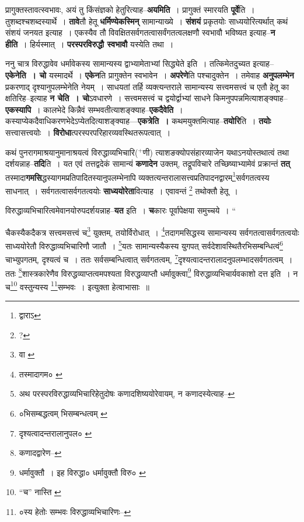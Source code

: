 \documentclass[article,12pt,a4paper]{memoir}
\newcommand{\add}[1]{($^{+}$#1)}
\begin{document}
	  \pstart प्रागुक्तस्तावत्स्वभावः, अयं तु किंसंज्ञको हेतुरित्याह--\textbf{अयमिति} । प्रागुक्तं स्मारयति \textbf{पूर्वे}ति । तुशब्दश्चशब्दस्यार्थे । \textbf{तावे}तौ हेतू \textbf{धर्मिण्येकस्मिन्} सामान्याख्ये । \textbf{संशयं} प्रकृतयोः साध्ययोरित्यर्थात् कथं संशयं जनयत इत्याह । एकस्यैव तौ विवक्षितसर्वगतत्वासर्वंगतत्वलक्षणौ स्वभावौ भविष्यत इत्याह--\textbf{न हीति} । हिर्यस्मात् । \textbf{परस्परविरुद्धौ स्वभावौ} यस्येति तथा ।
	\pend
      

	  \pstart ननु चात्र विरुद्धावेव धर्मावेकस्य सामान्यस्य द्वाभ्यामेताभ्यां सिद्ध्येते इति । तत्किमेतदुच्यत इत्याह--\textbf{एकेनेति । चो} यस्मादर्थे । \textbf{एकेन}ति प्रागुक्तेन स्वभावेन । \textbf{अपरेणे}ति पश्चादुक्तेन । तमेवाह \textbf{अनुपलम्भेन} प्रकरणाद् दृश्यानुपलम्भेनेति नेयम् । साधयतां तर्हि व्यक्त्यन्तराले सामान्यस्य सत्त्वमसत्त्वं च एतौ हेतू का क्षतिरिह--इत्याह \textbf{न चेति । चो}ऽवधारणे । सत्त्वमसत्त्वं च द्वयोर्द्वाभ्यां साधने किमनुपपन्नमित्याशङ्क्याह--\textbf{एकस्यापि} । कालभेदे किन्नैवं सम्भवतीत्याशङ्क्याह--\textbf{एकदैवेति} । कस्याप्येकदैवाधिकरणभेदेऽप्येतदित्याशङ्क्याह—\textbf{एकत्रेति ।} कथमयुक्तमित्याह--\textbf{तयोरि}ति । \textbf{तयोः} सत्त्वासत्त्वयोः । \textbf{विरोधा}त्परस्परपरिहारव्यवस्थितरूपत्वात् ।
	\pend
      

	  \pstart कथं पुनरागमाश्रयानुमानाश्रयत्वं विरुद्धाव्यभिचारि\add{णी} त्याशङक्योपसंहारव्याजेन यथाऽनयोस्तथात्वं तथा दर्शयन्नाह--\textbf{तदि}ति । यत एवं तत्तद्वदेकं सामान्यं \textbf{कणादेन} उक्तम्, तद्रूपविचारे तच्छिष्याभ्यामेवं प्रक्रान्तं \textbf{तत्} तस्मादा\textbf{गमसि}द्धस्यागमप्रतिपादितस्यानुपलम्भेनापि व्यक्तत्यन्तरालासत्त्वप्रतिपादनद्वारम्\footnote{द्वाराऽ}सर्वगतत्वस्य साधनात् । सर्वगतत्वासर्वगतत्वयोः \textbf{साध्ययोरेता}वित्याह । एवावन्तं \footnote{?} तथोक्तौ हेतू ।
	\pend
      

	  \pstart विरुद्धाव्यभिचारित्वमेवानयोरुपदर्शयन्नाह--\textbf{यत} इति । \textbf{च}कारः पूर्वापेक्षया समुच्चये ।  \leavevmode{} “
	  
	चैकस्यैकदैकत्र सत्त्वमसत्त्वं च\footnote{वा \cite{dp-msD}} युक्तम्, तयोर्विरोधात् । \footnote{तस्मादागम० \cite{dp-msB}}तदागमसिद्धस्य सामान्यस्य सर्वगतत्वासर्वगतत्वयोः साध्ययोरेतौ विरुद्धाव्यभिचारिणौ जातौ । \footnote{अथ परस्परविरुद्धाव्यभिचारिहेतुदोषः कणादशिष्ययोरेवायम्, न कणादस्येत्याह--\cite{dp-msD-n}}यतः सामान्यस्यैकस्य युगपत् सर्वदेशावस्थितैरभिसम्बन्धित्वं\footnote{०भिसम्बद्धत्वम् \cite{dp-msB} भिसम्बन्धत्वम् \cite{dp-msD}} चाभ्युपगतम्, दृश्यत्वं च । ततः सर्वसम्बन्धित्वात् सर्वगतत्वम्, \footnote{दृश्यत्वादन्तरालानुपल० \cite{dp-msA} \cite{dp-msB} \cite{dp-msC} \cite{dp-msD} \cite{dp-edP} \cite{dp-edH} \cite{dp-edE} \cite{dp-edN}}दृश्यत्वादन्तरालादनुपलम्भादसर्वगतत्वम् । ततः \footnote{कणादद्वारेण--\cite{dp-msD-n}}शास्त्रकारेणैव विरुद्धव्याप्तत्वमपश्यता विरुद्धव्याप्तौ धर्मावुक्त्वा\footnote{धर्मावुक्तौ । इह विरुद्धा० \cite{dp-msB} धर्मावुक्तौ विरु० \cite{dp-msC} \cite{dp-msD}} विरुद्धाव्यभिचार्यवकाशो दत्त इति । न च\footnote{“च” नास्ति \cite{dp-msB} \cite{dp-msD}} वस्तुन्यस्य \footnote{०स्य हेतोः सम्भवः \cite{dp-msB} \cite{dp-msD} विरुद्धाव्यभिचारिणः--\cite{dp-msD-n}}सम्भवः । इत्युक्ता हेत्वाभासाः ॥ 
	  
\end{document}
